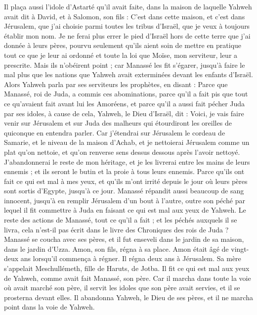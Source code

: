 \begin{multicols}{2}
Il plaça aussi l’idole d’Astarté qu’il avait faite, dans la maison de laquelle Yahweh avait dit à David, et à Salomon, son fils : C’est dans cette maison, et c’est dans Jérusalem, que j’ai choisie parmi toutes les tribus d’Israël, que je veux à toujours établir mon nom.
Je ne ferai plus errer le pied d’Israël hors de cette terre que j’ai donnée à leurs pères, pourvu seulement qu’ils aient soin de mettre en pratique tout ce que je leur ai ordonné et toute la loi que Moïse, mon serviteur, leur a prescrite.
Mais ils n’obéirent point ; car Manassé les fit s’égarer, jusqu’à faire le mal plus que les nations que Yahweh avait exterminées devant les enfants d’Israël.
Alors Yahweh parla par ses serviteurs les prophètes, en disant :
Parce que Manassé, roi de Juda, a commis ces abominations, parce qu’il a fait pis que tout ce qu’avaient fait avant lui les Amoréens, et parce qu’il a aussi fait pécher Juda par ses idoles,
à cause de cela, Yahweh, le Dieu d’Israël, dit : Voici, je vais faire venir sur Jérusalem et sur Juda des malheurs qui étourdiront les oreilles de quiconque en entendra parler.
Car j’étendrai sur Jérusalem le cordeau de Samarie, et le niveau de la maison d’Achab, et je nettoierai Jérusalem comme un plat qu’on nettoie, et qu’on renverse sens dessus dessous après l’avoir nettoyé.
J’abandonnerai le reste de mon héritage, et je les livrerai entre les mains de leurs ennemis ; et ils seront le butin et la proie à tous leurs ennemis.
Parce qu’ils ont fait ce qui est mal à mes yeux, et qu’ils m’ont irrité depuis le jour où leurs pères sont sortis d’Egypte, jusqu’à ce jour.
Manassé répandit aussi beaucoup de sang innocent, jusqu’à en remplir Jérusalem d’un bout à l’autre, outre son péché par lequel il fit commettre à Juda en faisant ce qui est mal aux yeux de Yahweh.
Le reste des actions de Manassé, tout ce qu’il a fait ; et les péchés auxquels il se livra, cela n’est-il pas écrit dans le livre des Chroniques des rois de Juda ?
Manassé se coucha avec ses pères, et il fut enseveli dans le jardin de sa maison, dans le jardin d’Uzza. Amon, son fils, régna à sa place.
Amon était âgé de vingt-deux ans lorsqu’il commença à régner. Il régna deux ans à Jérusalem. Sa mère s’appelait Meschullémeth, fille de Haruts, de Jotba.
Il fit ce qui est mal aux yeux de Yahweh, comme avait fait Manassé, son père.
Car il marcha dans toute la voie où avait marché son père, il servit les idoles que son père avait servies, et il se prosterna devant elles.
Il abandonna Yahweh, le Dieu de ses pères, et il ne marcha point dans la voie de Yahweh.

\end{multicols}
